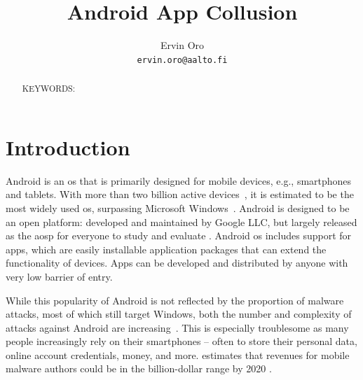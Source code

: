 \documentclass[article, oneside]{aaltoseries}
\title{Android App Collusion}
\author{Ervin Oro%
\\\textnormal{\texttt{ervin.oro@aalto.fi}}} %
\affiliation{\textbf{Tutor}: Jorden Whitefield} %
\newcommand{\TODO}[1]{\todo[inline]{#1}}
\begin{document}

\maketitle
{}

\begin{abstract}
\TODO{abstract}

\vspace{3mm}
\noindent KEYWORDS: 

\end{abstract}


\section{Introduction}
\label{sec:intro}

Android is an \gls{os} that is primarily designed for mobile devices, e.g., smartphones and tablets. With more than two billion active devices~\cite{AOSP2018}, it is estimated to be the most widely used \gls{os}, surpassing Microsoft Windows~\cite{AWSLLC2018, StatCounter2018}. Android is designed to be an open platform: developed and maintained by Google LLC, but largely released as the \gls{aosp} for everyone to study and evaluate \cite{AOSP2019c}. Android \gls{os} includes support for apps, which are easily installable application packages that can extend the functionality of devices. Apps can be developed and distributed by anyone with very low barrier of entry.

While this popularity of Android is not reflected by the proportion of malware attacks, most of which still target Windows, both the number and complexity of attacks against Android are increasing~\cite{AVTESTGH2018}. This is especially troublesome as many people increasingly rely on their smartphones -- often to store their personal data, online account credentials, money, and more. \citeauthor{McAfee2018} estimates that revenues for mobile malware authors could be in the billion-dollar range by 2020 \cite{McAfee2018}.
\end{document}
